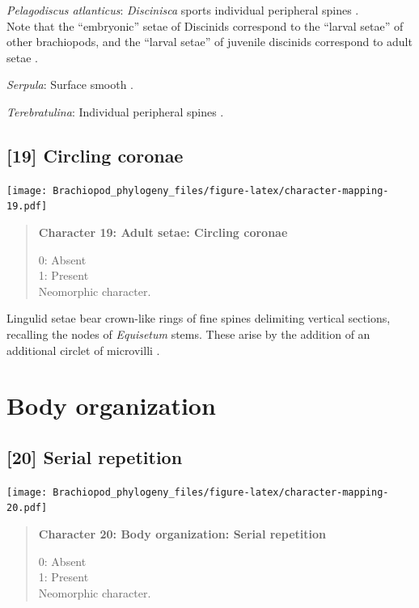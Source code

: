 \documentclass[openany]{book}
\begin{document}
\hypertarget{Pelagodiscus_atlanticus-coding-18}{}
\emph{Pelagodiscus atlanticus}: \emph{Discinisca} sports individual
peripheral spines \citep{Williams1997Introduction, Luter2003}.\\
Note that the ``embryonic'' setae of Discinids correspond to the
``larval setae'' of other brachiopods, and the ``larval setae'' of
juvenile discinids correspond to adult setae \citep{Luter2003}.

\hypertarget{Serpula-coding-18}{}
\emph{Serpula}: Surface smooth \citep{Sun2012}.

\hypertarget{Terebratulina-coding-18}{}
\emph{Terebratulina}: Individual peripheral spines \citep[in
\emph{Calloria};][]{Luter2000}.

\subsection*{{[}19{]} Circling coronae}\label{circling-coronae}

\texttt{[image: Brachiopod\_phylogeny\_files/figure-latex/character-mapping-19.pdf]}

\begin{quote}
\textbf{Character 19: Adult setae: Circling coronae}

0: Absent\\
1: Present\\
Neomorphic character.
\end{quote}

Lingulid setae bear crown-like rings of fine spines delimiting vertical
sections, recalling the nodes of \emph{Equisetum} stems. These arise by
the addition of an additional circlet of microvilli \citep[see][fig.
1e]{Luter2000}.

\section{Body organization}\label{body-organization}

\subsection*{{[}20{]} Serial repetition}\label{serial-repetition}

\texttt{[image: Brachiopod\_phylogeny\_files/figure-latex/character-mapping-20.pdf]}

\begin{quote}
\textbf{Character 20: Body organization: Serial repetition}

0: Absent\\
1: Present\\
Neomorphic character.
\end{quote}
\end{document}
